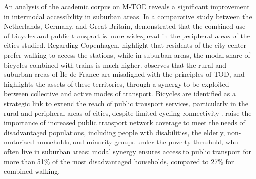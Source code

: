 \begin{refsegment}
An analysis of the academic corpus on \acrshort{M-TOD} reveals a significant improvement in intermodal accessibility in suburban areas. In a comparative study between the Netherlands, Germany, and Great Britain, \textcolor{blue}{\textcite[291]{martens_bicycle_2004}} demonstrated that the combined use of bicycles and public transport is more widespread in the peripheral areas of the cities studied. Regarding Copenhagen, \textcolor{blue}{\textcite[25]{halldorsdottir_home-end_2017}} highlight that residents of the city center prefer walking to access the stations, while in suburban areas, the modal share of bicycles combined with trains is much higher. \textcolor{blue}{\textcite[38]{stransky_periurbain_2019}} observes that the rural and suburban areas of Île-de-France are misaligned with the principles of TOD, and highlights the assets of these territories, through a synergy to be exploited between collective and active modes of transport. Bicycles are identified as a strategic link to extend the reach of public transport services, particularly in the rural and peripheral areas of cities, despite limited cycling connectivity \textcolor{blue}{\autocite[86]{zuo_incorporating_2021}}. \textcolor{blue}{\textcite[10]{zuo_determining_2018}} raise the importance of increased public transport network coverage to meet the needs of disadvantaged populations, including people with disabilities, the elderly, non-motorized households, and minority groups under the poverty threshold, who often live in suburban areas: modal synergy ensures access to public transport for more than 51\% of the most disadvantaged households, compared to 27\% for combined walking.%


\end{refsegment}
